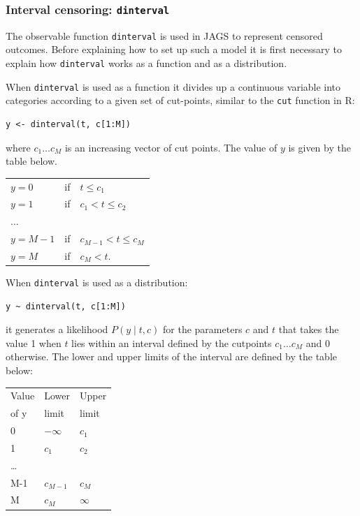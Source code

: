 \documentclass[11pt, a4paper, titlepage]{report}
\newcommand{\R}{\textsf{R}}
\begin{document}
\subsubsection{Interval censoring: \texttt{dinterval}}
\label{bugs:dinterval}

The observable function \texttt{dinterval} is used in JAGS to
represent censored outcomes. Before explaining how to set up such a
model it is first necessary to explain how \texttt{dinterval} works as
a function and as a distribution.

When \texttt{dinterval} is used as a function it divides up a
continuous variable into categories according to a given set of
cut-points, similar to the \texttt{cut} function in \R:
\begin{verbatim}
y <- dinterval(t, c[1:M])
\end{verbatim}
where $c_1 \ldots c_M$ is an increasing vector of cut points. The value
of $y$ is given by the table below.

\begin{center}
\begin{tabular}{lll}
  \hline
  $y = 0$   & if & $t \leq c_1$\\
  $y = 1$   & if & $c_1 < t \leq c_2$ \\
  $\ldots$  & \\
  $y = M-1$   & if & $c_{M-1} < t \leq c_M$ \\
  $y = M$   & if & $c_M < t$. \\
  \hline
\end{tabular}
\end{center}

When \texttt{dinterval} is used as a distribution:
\begin{verbatim}
y ~ dinterval(t, c[1:M])
\end{verbatim}
it generates a likelihood $P(y \mid t, c)$ for the parameters $c$ and
$t$ that takes the value 1 when $t$ lies within an interval defined by
the cutpoints $c_1 \ldots c_M$ and 0 otherwise. The lower and upper
limits of the interval are defined by the table below:

\begin{center}
\begin{tabular}{lll}
  \hline
  Value   & Lower     & Upper   \\
  of y    & limit     & limit   \\
  \hline
  0       & $-\infty$ & $c_1$     \\
  1       & $c_1$     & $c_2$     \\
  \ldots  &           &         \\
  M-1     & $c_{M-1}$  & $c_M$     \\
  M       & $c_{M}$   & $\infty$ \\
  \hline
\end{tabular}
\end{center}
\end{document}
